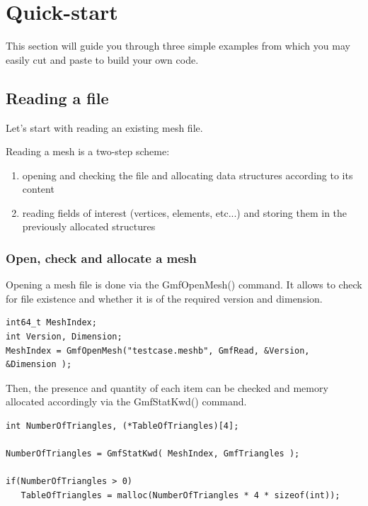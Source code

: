 \documentclass[a4paper,12pt]{article}
\begin{document}
%
%

\section{Quick-start}

This section will guide you through three simple examples from which you may easily cut and paste to build your own code.

\subsection{Reading a file}

Let's start with reading an existing mesh file.

Reading a mesh is a two-step scheme:

\begin{enumerate}
\item opening and checking the file and allocating data structures according to its content
\item reading fields of interest (vertices, elements, etc...) and storing them in the previously allocated structures
\end{enumerate}

\subsubsection{Open, check and allocate a mesh}

Opening a mesh file is done via the GmfOpenMesh() command. It allows to check for file existence and whether it is of the required version and dimension.

\begin{tt}
\begin{verbatim}
int64_t MeshIndex;
int Version, Dimension;
MeshIndex = GmfOpenMesh("testcase.meshb", GmfRead, &Version, &Dimension );
\end{verbatim}
\end{tt}
\normalfont

Then, the presence and quantity of each item can be checked and memory allocated accordingly via the GmfStatKwd() command.

\begin{tt}
\begin{verbatim}
int NumberOfTriangles, (*TableOfTriangles)[4];

NumberOfTriangles = GmfStatKwd( MeshIndex, GmfTriangles );

if(NumberOfTriangles > 0)
   TableOfTriangles = malloc(NumberOfTriangles * 4 * sizeof(int));
\end{verbatim}
\end{tt}
\normalfont
\end{document}
